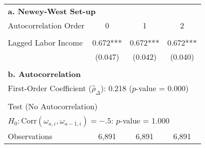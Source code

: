 \begin{tabular}{lccc} \toprule
 \multicolumn{4}{l}{\textbf{a. Newey-West Set-up}} \\
Autocorrelation Order & 0 & 1 & 2 \\ \\ 
Lagged Labor Income & 0.672*** & 0.672*** & 0.672*** \\
 & (0.047) & (0.042) & (0.040) \\ \\ \midrule
 \multicolumn{4}{l}{\textbf{b. Autocorrelation}} \\
 \multicolumn{4}{l}{First-Order Coefficient ($\hat{\rho}_{\Delta}$): 0.218 ($p$-value = 0.000)} \\ \\
 \multicolumn{4}{l}{Test (No Autocorrelation)} \\ 
  \multicolumn{4}{l}{$H_{0}: \text{Corr} \left( \omega_{a,i}, \omega_{a-1,i} \right) = -.5$: $p$-value = 1.000} \\ \midrule
   Observations & 6,891 & 6,891 & 6,891 \\ \bottomrule
\end{tabular}
